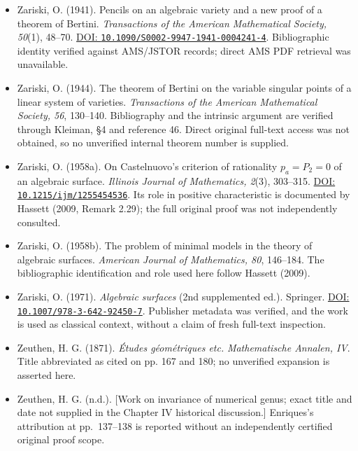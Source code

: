 \begin{sloppypar}
\begin{itemize}
\item Zariski, O. (1941). Pencils on an algebraic variety and a new proof of a theorem of Bertini. \emph{Transactions of the American Mathematical Society, 50}(1), 48--70. \href{https://doi.org/10.1090/S0002-9947-1941-0004241-4}{DOI: \nolinkurl{10.1090/S0002-9947-1941-0004241-4}}. Bibliographic identity verified against AMS/JSTOR records; direct AMS PDF retrieval was unavailable.

\item Zariski, O. (1944). The theorem of Bertini on the variable singular points of a linear system of varieties. \emph{Transactions of the American Mathematical Society, 56}, 130--140. Bibliography and the intrinsic argument are verified through Kleiman, §4 and reference 46. Direct original full-text access was not obtained, so no unverified internal theorem number is supplied.

\item Zariski, O. (1958a). On Castelnuovo's criterion of rationality $p_a=P_2=0$ of an algebraic surface. \emph{Illinois Journal of Mathematics, 2}(3), 303--315. \href{https://doi.org/10.1215/ijm/1255454536}{DOI: \nolinkurl{10.1215/ijm/1255454536}}. Its role in positive characteristic is documented by Hassett (2009, Remark 2.29); the full original proof was not independently consulted.

\item Zariski, O. (1958b). The problem of minimal models in the theory of algebraic surfaces. \emph{American Journal of Mathematics, 80}, 146--184. The bibliographic identification and role used here follow Hassett (2009).

\item Zariski, O. (1971). \emph{Algebraic surfaces} (2nd supplemented ed.). Springer. \href{https://doi.org/10.1007/978-3-642-92450-7}{DOI: \nolinkurl{10.1007/978-3-642-92450-7}}. Publisher metadata was verified, and the work is used as classical context, without a claim of fresh full-text inspection.

\item Zeuthen, H. G. (1871). \emph{\'Etudes g\'eom\'etriques etc.} \emph{Mathematische Annalen, IV}. Title abbreviated as cited on pp. 167 and 180; no unverified expansion is asserted here.

\item Zeuthen, H. G. (n.d.). {[}Work on invariance of numerical genus; exact title and date not supplied in the Chapter IV historical discussion.{]} Enriques's attribution at pp.~137--138 is reported without an independently certified original proof scope.
\end{itemize}
\end{sloppypar}
